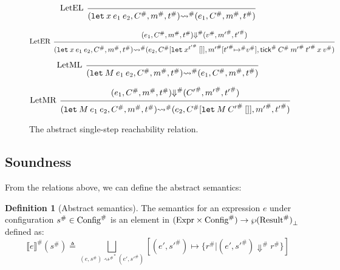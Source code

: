 \documentclass[acmsmall,screen]{acmart}
\theoremstyle{definition}
\newtheorem{definition}{Definition}[section]
\newcommand*{\A}[1]{{#1}^{\#}}
\newcommand*{\Expr}{\text{Expr}}
\newcommand*{\Time}{\mathbb{T}}
\newcommand*{\ATime}{\A{\Time}}
\newcommand*{\mem}{m}
\newcommand*{\AConfig}[1]{\A{\text{Config}}\vphantom{#1}}
\newcommand*{\AResult}[1]{\A{\text{Result}}\vphantom{#1}}
\newcommand*{\sembracket}[1]{\lBrack{#1}\rBrack}
\newcommand*{\tick}{\mathsf{tick}}
\begin{document}
\begin{figure}[htb]
  \[
    \begin{prooftree}
      \infer[left label=LetEL]0{
      (\mathtt{let}\:x\:e_1\:e_2, \A{C}, \A{\mem}, \A{t})
      \A\rightsquigarrow
      (e_{1}, \A{C}, \A{\mem}, \A{t})
      }
    \end{prooftree}
  \]

  \[
    \begin{prooftree}
      \hypo{
        \begin{matrix}
          (e_{1}, \A{C}, \A{\mem}, \A{t})
          \A\Downarrow
          (\A{v}, \A{\mem'}, \A{t'})
        \end{matrix}
      }
      \infer[left label=LetER]1{
      (\mathtt{let}\:x\:e_1\:e_2, \A{C}, \A{\mem}, \A{t})
      \A\rightsquigarrow
      (e_{2}, \A{C}[\mathtt{let}\:x^{\A{t'}}\:[]], \A{\mem'}[\A{t'}\A{\mapsto} \A{v}], \A{\tick}\:\A{C}\:\A{\mem'}\:\A{t'}\:x\:\A{v})
      }
    \end{prooftree}
  \]

  \[
    \begin{prooftree}
      \infer[left label=LetML]0{
      (\mathtt{let}\:M\:e_{1}\:e_{2}, \A{C}, \A{\mem}, \A{t})
      \A\rightsquigarrow
      (e_{1}, \A{C}, \A{\mem}, \A{t})
      }
    \end{prooftree}
  \]

  \[
    \begin{prooftree}
      \hypo{
        \begin{matrix}
          (e_{1}, \A{C}, \A{\mem}, \A{t})
          \A\Downarrow
          (\A{C'}, \A{\mem'}, \A{t'})
        \end{matrix}
      }
      \infer[left label=LetMR]1{
      (\mathtt{let}\:M\:e_{1}\:e_{2}, \A{C}, \A{\mem}, \A{t})
      \A\rightsquigarrow
      (e_{2}, \A{C}[\mathtt{let}\:M\:\A{C'}\:[]], \A{\mem'}, \A{t'})
      }
    \end{prooftree}
  \]
  \caption{The abstract single-step reachability relation.}
\end{figure}
\subsection{Soundness}

From the relations above, we can define the abstract semantics:
\begin{definition}[Abstract semantics]
  The semantics for an expression $e$ under configuration $\A{s}\in\AConfig{\ATime}$ is an element in $(\Expr\times\AConfig{\ATime})\rightarrow{\wp(\AResult{\ATime})}_{\bot}$ defined as:
  \[
    \A{\sembracket{e}}(\A{s})\triangleq\bigsqcup_{(e,\A{s}){\A\rightsquigarrow}^{*}(e',\A{s'})}[(e',\A{s'})\mapsto\{\A{r}|(e',\A{s'})\A\Downarrow \A{r}\}]
  \]
\end{definition}
\end{document}
